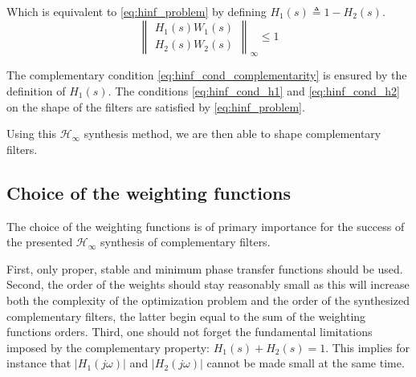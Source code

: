 \documentclass[letterpaper, 10 pt, conference]{ieeeconf}
\begin{document}
Which is equivalent to \eqref{eq:hinf_problem} by defining \(H_1(s) \triangleq 1 - H_2(s)\).
\begin{equation}
\label{eq:hinf_problem}
  \left\|\begin{matrix} H_1(s) W_1(s) \\ H_2(s) W_2(s) \end{matrix}\right\|_\infty \le 1
\end{equation}

The complementary condition \eqref{eq:hinf_cond_complementarity} is ensured by the definition of \(H_1(s)\). The conditions \eqref{eq:hinf_cond_h1} and \eqref{eq:hinf_cond_h2} on the shape of the filters are satisfied by \eqref{eq:hinf_problem}.

Using this \(\mathcal{H}_\infty\) synthesis method, we are then able to shape complementary filters.

\subsection{Choice of the weighting functions}
\label{sec:orgd7d262d}
\label{sec:hinf_weighting_func}

The choice of the weighting functions is of primary importance for the success of the presented \(\mathcal{H}_\infty\) synthesis of complementary filters.

First, only proper, stable and minimum phase transfer functions should be used.
Second, the order of the weights should stay reasonably small as this will increase both the complexity of the optimization problem and the order of the synthesized complementary filters, the latter begin equal to the sum of the weighting functions orders.
Third, one should not forget the fundamental limitations imposed by the complementary property: \(H_1(s) + H_2(s) = 1\).
This implies for instance that \(|H_1(j\omega)|\) and \(|H_2(j\omega)|\) cannot be made small at the same time.
\end{document}
